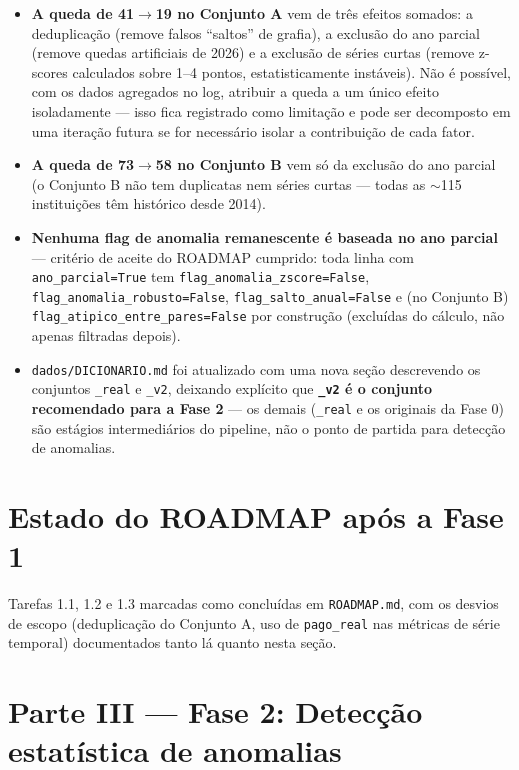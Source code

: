 \documentclass[11pt,a4paper]{article}
\begin{document}
\begin{itemize}
    \item \textbf{A queda de 41$\to$19 no Conjunto A} vem de três efeitos
    somados: a deduplicação (remove falsos ``saltos'' de grafia), a
    exclusão do ano parcial (remove quedas artificiais de 2026) e a
    exclusão de séries curtas (remove z-scores calculados sobre 1--4
    pontos, estatisticamente instáveis). Não é possível, com os dados
    agregados no log, atribuir a queda a um único efeito isoladamente ---
    isso fica registrado como limitação e pode ser decomposto em uma
    iteração futura se for necessário isolar a contribuição de cada fator.
    \item \textbf{A queda de 73$\to$58 no Conjunto B} vem só da exclusão do
    ano parcial (o Conjunto B não tem duplicatas nem séries curtas ---
    todas as ${\sim}$115 instituições têm histórico desde 2014).
    \item \textbf{Nenhuma flag de anomalia remanescente é baseada no ano
    parcial} --- critério de aceite do ROADMAP cumprido: toda linha com
    \texttt{ano\_parcial=True} tem \texttt{flag\_anomalia\_zscore=False},
    \texttt{flag\_anomalia\_robusto=False}, \texttt{flag\_salto\_anual=False}
    e (no Conjunto B) \texttt{flag\_atipico\_entre\_pares=False} por
    construção (excluídas do cálculo, não apenas filtradas depois).
    \item \texttt{dados/DICIONARIO.md} foi atualizado com uma nova seção
    descrevendo os conjuntos \texttt{\_real} e \texttt{\_v2}, deixando
    explícito que \textbf{\texttt{\_v2} é o conjunto recomendado para a
    Fase 2} --- os demais (\texttt{\_real} e os originais da Fase 0) são
    estágios intermediários do pipeline, não o ponto de partida para
    detecção de anomalias.
\end{itemize}

\section{Estado do ROADMAP após a Fase 1}

Tarefas 1.1, 1.2 e 1.3 marcadas como concluídas em \texttt{ROADMAP.md}, com
os desvios de escopo (deduplicação do Conjunto A, uso de
\texttt{pago\_real} nas métricas de série temporal) documentados tanto lá
quanto nesta seção.

\clearpage
\section*{Parte III --- Fase 2: Detecção estatística de anomalias}
\end{document}
